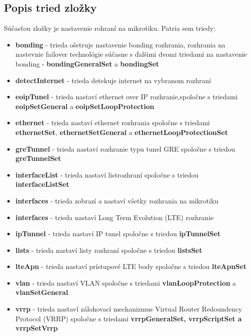 \subsection{Popis tried zložky}
Súčasťou zložky je nastavenie rohraní na mikrotiku. Patria sem triedy:
\begin{itemize}
\item \textbf{bonding} - trieda ošetruje nastavenie bonding rozhrania, rozhrania na nastevnie failover technológie súčasne s ďalšimi dvomi triedami na nastavenie bonding - \textbf{bondingGeneralSet} a \textbf{bondingSet} 
\item \textbf{detectInternet} - trieda detekuje internet na vybranom rozhraní
\item \textbf{eoipTunel} - trieda nastaví ethernet over IP rozhranie,spoločne s triedami \textbf{eoipSetGeneral} a \textbf{eoipSetLoopProtection}
\item \textbf{ethernet} - trieda nastaví ethernet rozhrania spoločne s triedami \textbf{ethernetSet}, \textbf{ethernetSetGeneral} a \textbf{ethernetLoopProtectionSet}
\item \textbf{greTunnel} - trieda nastaví rozhranie typu tunel GRE spoločne s triedou \textbf{greTunnelSet}
\item \textbf{interfaceList} - trieda nastaví listrozhraní spoločne s triedou \textbf{interfaceListSet}
\item \textbf{interfaces} - trieda zobrazí  a nastaví všetky rozhrania na mikrotiku
\item \textbf{interfaces} - trieda nastaví Long Term Evolution (LTE) rozhranie
\item \textbf{ipTunnel} - trieda nastaví IP tunel spoločne s triedou \textbf{ipTunnelSet}
\item \textbf{lists} - trieda nastaví listy rozhraní spoločne s triedou \textbf{listsSet}
\item \textbf{lteApn} - trieda nastaví prístupové LTE body spoločne s triedou \textbf{lteApnSet}
\item \textbf{vlan} - trieda nastaví VLAN spoločne s triedami \textbf{vlanLoopProtection} a \textbf{vlanSetGeneral}
\item \textbf{vrrp} - trieda nastaví zálohovací mechanizmus  Virtual Router Redoundency Protocol (VRRP) spoločne s triedami \textbf{vrrpGeneralSet, vrrpScriptSet a vrrpSetVrrp}
\end{itemize}
